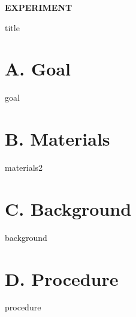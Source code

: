 \documentclass[cover.tex]{subfiles}
\begin{document}
 


\hfill\vspace{0.2cm}\begin{center}{\large \bfseries EXPERIMENT \thechapter\par\Huge
 {title}
 \\[5pt] \par}\vspace{0.2cm}\end{center}\par\noindent

 
 
\section*{A. Goal}
{goal}
\section*{B. Materials}
{materials2}
\section*{C. Background}
{background}



\section*{D. Procedure}
{procedure}
\clearpage\mbox{}\clearpage
\end{document}
